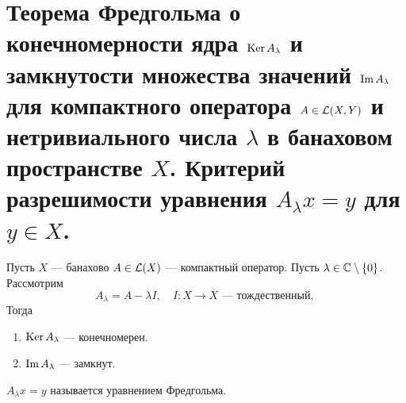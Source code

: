 \newpage
\section{Теорема Фредгольма о конечномерности ядра $\operatorname{Ker} A_\lambda$ и замкнутости множества значений $\operatorname{Im} A_\lambda$ для компактного оператора $A \in \mathcal{L}(X,Y)$ и нетривиального числа $\lambda$ в банаховом пространстве $X$. Критерий разрешимости уравнения $A_\lambda x = y$ для $y \in X$.}
\begin{theorem}\label{th:fr1}
	\hfill
	
	Пусть $X$ --- банахово $A\in \mathcal{L}(X)$ --- компактный оператор. Пусть $\lambda \in \mathbb{C} \setminus \{0\}$. Рассмотрим
	$$
	A_\lambda = A - \lambda I, \quad I \colon X \to X \text{ --- тождественный, } 
	$$
	Тогда
	\begin{enumerate}
		\item $\operatorname{Ker} A_\lambda$ --- конечномерен. 
		\item $\operatorname{Im} A_\lambda$ --- замкнут. 
	\end{enumerate}
	
\end{theorem}
\begin{remark}
	$A_\lambda x = y$ называется уравнением Фредгольма. 
\end{remark}
